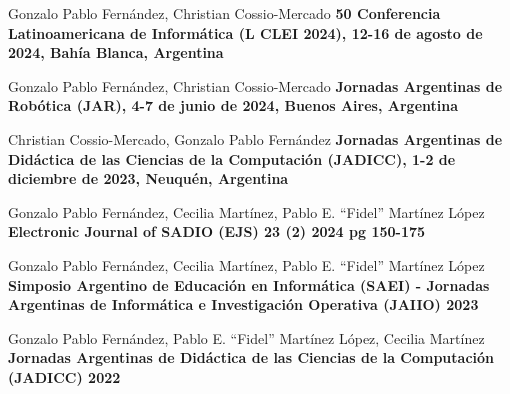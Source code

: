 
  {Gonzalo Pablo Fernández, Christian Cossio-Mercado}
  {\textbf{50 Conferencia Latinoamericana de Informática (L CLEI 2024), 12-16 de agosto de 2024, Bahía
  Blanca, Argentina}}

    \sepspace

  {Gonzalo Pablo Fernández, Christian Cossio-Mercado}
  {\textbf{Jornadas Argentinas de Robótica (JAR), 4-7 de junio de 2024, Buenos Aires, Argentina}}

    \sepspace

  {Christian Cossio-Mercado, Gonzalo Pablo Fernández}
  {\textbf{Jornadas Argentinas de Didáctica de las Ciencias de la Computación (JADICC), 1-2 de diciembre de 2023, Neuquén, Argentina}}

    \sepspace

  {Gonzalo Pablo Fernández, Cecilia Martínez, Pablo E. ``Fidel'' Martínez López}
  {\textbf{Electronic Journal of SADIO (EJS) 23 (2) 2024 pg 150-175}}

    \sepspace

  {Gonzalo Pablo Fernández, Cecilia Martínez, Pablo E. ``Fidel'' Martínez López}
  {\textbf{Simposio Argentino de Educación en Informática (SAEI) - Jornadas Argentinas de Informática e Investigación Operativa (JAIIO) 2023}}

    \sepspace

  {Gonzalo Pablo Fernández, Pablo E. ``Fidel'' Martínez López, Cecilia Martínez}
  {\textbf{Jornadas Argentinas de Didáctica de las Ciencias de la Computación (JADICC) 2022}}


